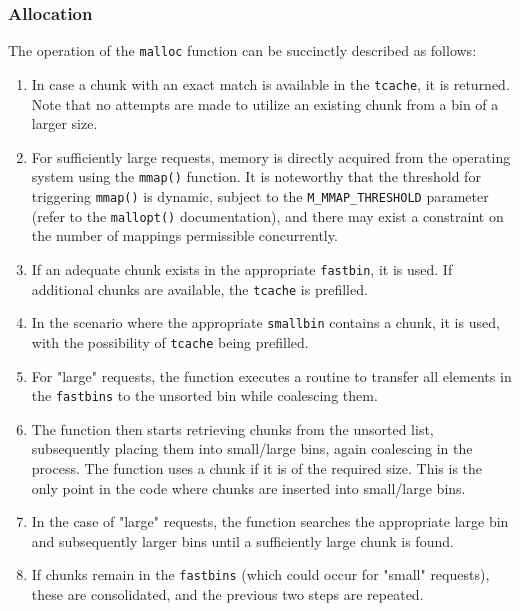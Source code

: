 \documentclass{article}
\begin{document}
\subsubsection{Allocation}
The operation of the \texttt{malloc} function can be succinctly described as
follows:

\begin{enumerate}
\item In case a chunk with an exact match is available in the \texttt{tcache},
it is returned. Note that no attempts are made to utilize an existing chunk from
a bin of a larger size.

\item For sufficiently large requests, memory is directly acquired from the
operating system using the \texttt{mmap()} function. It is noteworthy that the
threshold for triggering \texttt{mmap()} is dynamic, subject to the
\texttt{M\_MMAP\_THRESHOLD} parameter (refer to the \texttt{mallopt()}
documentation), and there may exist a constraint on the number of mappings
permissible concurrently.

\item If an adequate chunk exists in the appropriate \texttt{fastbin}, it is
used. If additional chunks are available, the \texttt{tcache} is prefilled.

\item In the scenario where the appropriate \texttt{smallbin} contains a chunk,
it is used, with the possibility of \texttt{tcache} being prefilled.

\item For "large" requests, the function executes a routine to transfer all
elements in the \texttt{fastbins} to the unsorted bin while coalescing them.

\item The function then starts retrieving chunks from the unsorted list,
subsequently placing them into small/large bins, again coalescing in the
process. The function uses a chunk if it is of the required size. This is the
only point in the code where chunks are inserted into small/large bins.

\item In the case of "large" requests, the function searches the appropriate
large bin and subsequently larger bins until a sufficiently large chunk is
found.

\item If chunks remain in the \texttt{fastbins} (which could occur for "small"
requests), these are consolidated, and the previous two steps are repeated.


\end{enumerate}
\end{document}
